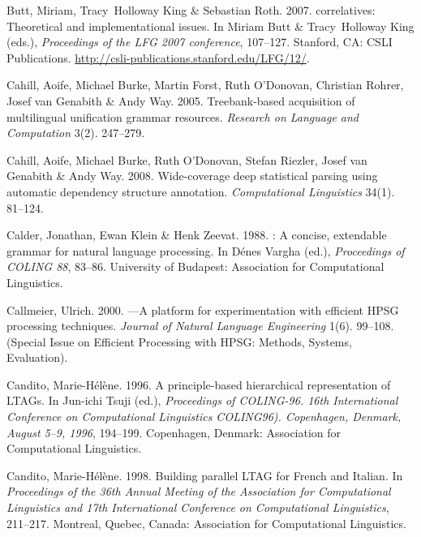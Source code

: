\begin{thebibliography}{1420}
Butt, Miriam, Tracy~Holloway King \& Sebastian Roth. 2007.
 correlatives: {Theoretical} and implementational issues.
\newblock In Miriam Butt \& Tracy~Holloway King (eds.), \emph{Proceedings of
  the {LFG 2007} conference}, 107--127. Stanford, CA: CSLI Publications.
\newblock \urlprefix\url{http://csli-publications.stanford.edu/LFG/12/}.

Cahill, Aoife, Michael Burke, Martin Forst, Ruth O'Donovan, Christian Rohrer,
  Josef van Genabith \& Andy Way. 2005.
\newblock Treebank-based acquisition of multilingual unification grammar
  resources.
\newblock \emph{Research on Language and Computation} 3(2). 247--279.

Cahill, Aoife, Michael Burke, Ruth O'Donovan, Stefan Riezler, Josef van
  Genabith \& Andy Way. 2008.
\newblock Wide-coverage deep statistical parsing using automatic dependency
  structure annotation.
\newblock \emph{Computational Linguistics} 34(1). 81--124.

Calder, Jonathan, Ewan Klein \& Henk Zeevat. 1988.
: {A} concise, extendable grammar for
  natural language processing.
\newblock In D{\'e}nes Vargha (ed.), \emph{Proceedings of {COLING} 88}, 83--86.
  University of Budapest: Association for Computational Linguistics.

Callmeier, Ulrich. 2000.
---{A} platform for experimentation with efficient {HPSG}
  processing techniques.
\newblock \emph{Journal of Natural Language Engineering} 1(6). 99--108.
\newblock (Special Issue on Efficient Processing with {HPSG}: Methods, Systems,
  Evaluation).

Candito, Marie-H{\'e}l{\`e}ne. 1996.
\newblock A principle-based hierarchical representation of {LTAGs}.
\newblock In {Jun-ichi} Tsuji (ed.), \emph{Proceedings of {COLING-96. 16th
  International Conference on Computational Linguistics COLING96). Copenhagen,
  Denmark, August 5--9, 1996}}, 194--199. Copenhagen, Denmark: Association for
  Computational Linguistics.

Candito, Marie-H{\'e}l{\`e}ne. 1998.
\newblock Building parallel {LTAG} for {French} and {Italian}.
\newblock In \emph{Proceedings of the {36th Annual Meeting of the Association
  for Computational Linguistics and 17th International Conference on
  Computational Linguistics}}, 211--217. Montreal, Quebec, Canada: Association
  for Computational Linguistics.


\end{thebibliography}
